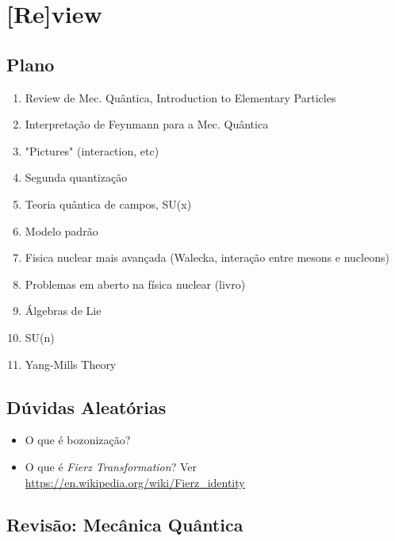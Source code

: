 \chapter{[Re]view}

\section{Plano}

\begin{enumerate}
\item Review de Mec. Quântica, Introduction to Elementary Particles
\item Interpretação de Feynmann para a Mec. Quântica
\item "Pictures" (interaction, etc)
\item Segunda quantização
\item Teoria quântica de campos, SU(x)
\item Modelo padrão
\item Fisica nuclear mais avançada (Walecka, interação entre mesons e nucleons)
\item Problemas em aberto na física nuclear (livro)
\item Álgebras de Lie
\item SU(n)
\item Yang-Mills Theory
\end{enumerate}

\section{Dúvidas Aleatórias}
\begin{itemize}
	\item O que é bozonização?
	\item O que é \emph{Fierz Transformation}? Ver \url{https://en.wikipedia.org/wiki/Fierz_identity}
\end{itemize}

\section{Revisão: Mecânica Quântica}

